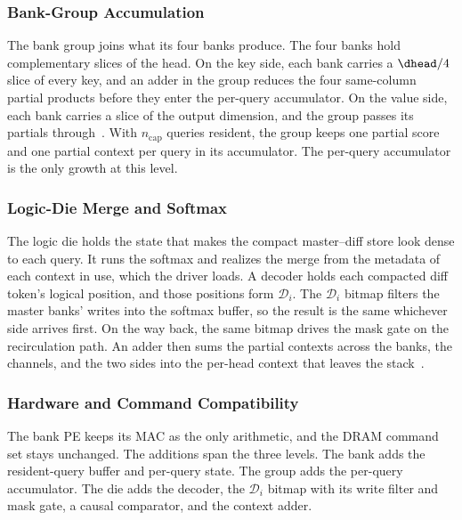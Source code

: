 \subsubsection{Bank-Group Accumulation}
\label{sec:bankgroup}

The bank group joins what its four banks produce.
The four banks hold complementary slices of the head.
On the key side, each bank carries a $\dhead/4$ slice of
every key, and an adder in the group reduces the four
same-column partial products before they enter the
per-query accumulator.
On the value side, each bank carries a slice of the output
dimension, and the group passes its partials
through~\cite{attacc}.
With $n_{\mathrm{cap}}$ queries resident, the group keeps one
partial score and one partial context per query in its
accumulator.
The per-query accumulator is the only growth at this level.

\subsubsection{Logic-Die Merge and Softmax}
\label{sec:logicdie}

The logic die holds the state that makes the compact
master--diff store look dense to each query.
It runs the softmax and realizes the merge from the metadata
of each context in use, which the driver loads.
A decoder holds each compacted diff token's logical
position, and those positions form $\mathcal{D}_i$.
The $\mathcal{D}_i$ bitmap filters the master banks' writes
into the softmax buffer, so the result is the same whichever
side arrives first.
On the way back, the same bitmap drives the mask gate on the
recirculation path.
An adder then sums the partial contexts across the banks,
the channels, and the two sides into the per-head context
that leaves the stack~\cite{attacc}.

\subsubsection{Hardware and Command Compatibility}
\label{sec:compat}

The bank PE keeps its MAC as the only arithmetic, and the
DRAM command set stays unchanged.
The additions span the three levels.
The bank adds the resident-query buffer and per-query state.
The group adds the per-query accumulator.
The die adds the decoder, the $\mathcal{D}_i$ bitmap with
its write filter and mask gate, a causal comparator, and the
context adder.
